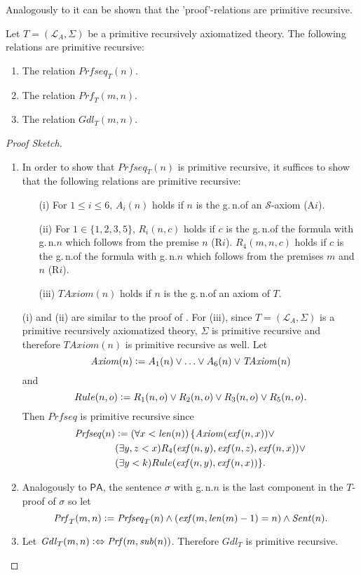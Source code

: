 Analogously to \PA it can be shown that the 'proof'-relations are primitive recursive.
\begin{thm}
Let $T = (\mathcal{L}_A, \Sigma)$ be a primitive recursively axiomatized theory. The following relations are primitive recursive:
\begin{enumerate}[label=({\arabic*})]
\item The relation $\mathit{Prfseq}_T(n)$.
\item The relation $\mathit{Prf}_T(m,n)$.
\item The relation $\mathit{Gdl_T}(m,n)$.
\end{enumerate}
\end{thm}
\begin{proof}[Proof Sketch]

\begin{enumerate}[label=({\arabic*})]
\item In order to show that $\mathit{Prfseq}_T(n)$ is primitive recursive, it suffices to show that the following relations are primitive recursive: 

\begin{enumerate}
\item[(i)] For $1 \le i \le 6$, $A_i(n)$ holds if $n$ is the g.\,n.\@ of an $\mathcal{S}$-axiom (A$i$).
\item[(ii)] For $1 \in \lbrace 1, 2, 3, 5 \rbrace$, $R_i(n,c)$ holds if $c$ is the g.\,n.\@ of the formula with g.\,n.\@ $n$ which follows from the premise $n$ (R$i$). $R_4(m, n,c)$ holds if $c$ is the g.\,n.\@ of the formula with g.\,n.\@ $n$ which follows from the premises $m$ and $n$ (R$i$).
\item[(iii)] $\mathit{TAxiom}(n)$ holds if $n$ is the g.\,n.\@ of an axiom of $T$. 
\end{enumerate}
(i) and (ii) are similar to the proof of .
For (iii), since $T=(\mathcal{L}_A, \Sigma)$ is a primitive recursively axiomatized theory, $\Sigma$ is primitive recursive and therefore $\mathit{TAxiom}(n)$ is primitive recursive as well. 
Let 
\[ \mathit{Axiom}(n) \vcentcolon= A_1(n) \vee \ldots \vee A_6(n) \vee \mathit{TAxiom}(n) \]
and 
\[ Rule(n, o) \vcentcolon= R_1(n,o) \vee R_2(n,o) \vee R_3(n,o) \vee R_5(n,o). \]  
Then $\mathit{Prfseq}$ is primitive recursive since \begin{align*}
\mathit{Prfseq}(n) & \vcentcolon= ( \forall x < \mathit{len}(n)) \, \lbrace \mathit{Axiom}(\mathit{exf}(n,x))  \vee \\
&( \exists y, z < x )  R_4(\mathit{exf}(n,y), \mathit{exf}(n,z), \mathit{exf}(n,x)) \vee \\
&(\exists y < k )  Rule(\mathit{exf}(n,y), \mathit{exf}(n,x))\rbrace.
\end{align*}
\item Analogously to $\mathsf{PA}$, the sentence $\sigma$ with g.\,n.\@ $n$ is the last component in the $T$-proof of $\sigma$ so let
\[ \mathit{Prf}_T(m,n) \vcentcolon= \mathit{Prfseq}_T(n) \wedge ( \mathit{exf}(m, \mathit{len}(m)-1)= n ) \wedge \mathit{Sent}(n). \]
\item Let $\mathit{Gdl}_T(m,n) \vcentcolon \Leftrightarrow \mathit{Prf}(m, \mathit{sub}(n))$. Therefore $\mathit{Gdl}_T$ is primitive recursive.
\end{enumerate}
\end{proof}

